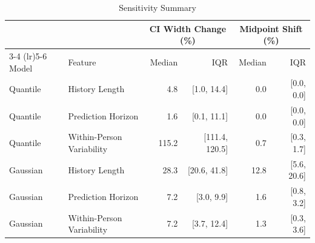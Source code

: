 \begin{table}[ht]
\centering
\footnotesize
\begin{tabular}{llrrrr}
\toprule
 & & \multicolumn{2}{c}{CI Width Change (\%)} & \multicolumn{2}{c}{Midpoint Shift (\%)} \\
\cmidrule(lr){3-4} \cmidrule(lr){5-6}
Model & Feature & Median & IQR & Median & IQR \\
\midrule
Quantile & History Length & 4.8 & [1.0, 14.4] & 0.0 & [0.0, 0.0] \\
Quantile & Prediction Horizon & 1.6 & [0.1, 11.1] & 0.0 & [0.0, 0.0] \\
Quantile & Within-Person Variability & 115.2 & [111.4, 120.5] & 0.7 & [0.3, 1.7] \\
\midrule
Gaussian & History Length & 28.3 & [20.6, 41.8] & 12.8 & [5.6, 20.6] \\
Gaussian & Prediction Horizon & 7.2 & [3.0, 9.9] & 1.6 & [0.8, 3.2] \\
Gaussian & Within-Person Variability & 7.2 & [3.7, 12.4] & 1.3 & [0.3, 3.6] \\
\bottomrule
\end{tabular}
\caption{Sensitivity Summary}
\label{tab:sensitivity_summary}
\end{table}